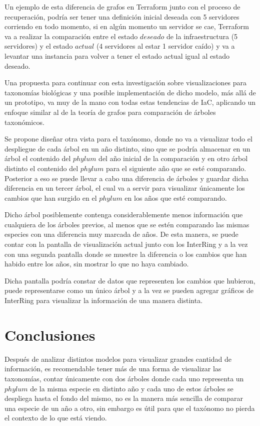 \documentclass[journal]{IEEEtran}
\begin{document}
Un ejemplo de esta diferencia de grafos en Terraform junto con el proceso de recuperación, podría ser tener una definición inicial deseada con 5 servidores corriendo en todo momento, si en algún momento un servidor se cae, Terraform va a realizar la comparación entre el estado $deseado$ de la infraestructura (5 servidores) y el estado $actual$ (4 servidores al estar 1 servidor caído) y va a levantar una instancia para volver a tener el estado actual igual al estado deseado.

Una propuesta para continuar con esta investigación sobre visualizaciones para taxonomías biológicas y una posible implementación de dicho modelo, más allá de un prototipo, va muy de la mano con todas estas tendencias de IaC, aplicando un enfoque similar al de la teoría de grafos para comparación de árboles taxonómicos.

Se propone diseñar otra vista para el taxónomo, donde no va a visualizar todo el despliegue de cada árbol en un año distinto, sino que se podría almacenar en un árbol el contenido del $phylum$ del año inicial de la comparación y en otro árbol distinto el contenido del $phylum$ para el siguiente año que se esté comparando. Posterior a eso se puede llevar a cabo una diferencia de árboles y guardar dicha diferencia en un tercer árbol, el cual va a servir para visualizar únicamente los cambios que han surgido en el $phylum$ en los años que esté comparando. 

Dicho árbol posiblemente contenga considerablemente menos información que cualquiera de los árboles previos, al menos que se estén comparando las mismas especies con una diferencia muy marcada de años. De esta manera, se puede contar con la pantalla de visualización actual junto con los InterRing y a la vez con una segunda pantalla donde se muestre la diferencia o los cambios que han habido entre los años, sin mostrar lo que no haya cambiado.

Dicha pantalla podría constar de datos que representen los cambios que hubieron, puede representarse como un único árbol y a la vez se pueden agregar gráficos de InterRing para visualizar la información de una manera distinta. 

\section{Conclusiones}
Después de analizar distintos modelos para visualizar grandes cantidad de información, es recomendable tener más de una forma de visualizar las taxonomías, contar únicamente con dos árboles donde cada uno representa un $phylum$ de la misma especie en distinto año y cada uno de estos árboles se despliega hasta el fondo del mismo, no es la manera más sencilla de comparar una especie de un año a otro, sin embargo es útil para que el taxónomo no pierda el contexto de lo que está viendo. 
\end{document}
